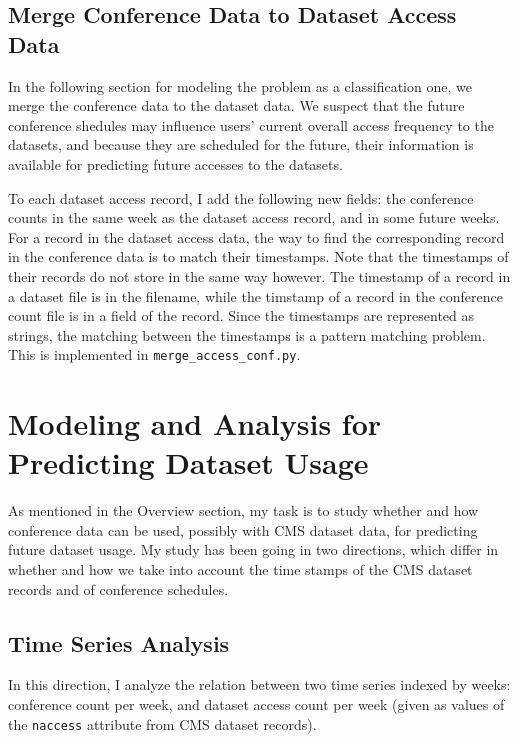 \documentclass[final, 12pt]{elsarticle}
\begin{document}
\subsection{Merge Conference Data to Dataset Access Data}

In the following section for modeling the problem as a classification one, we  merge the conference data to the dataset data.
We suspect that the future conference shedules may influence users' current overall access frequency to the datasets, and because they are scheduled for the future, their information is available for predicting future accesses to the datasets.

To each dataset access record, I add the following new fields: the conference counts in the same week as the dataset access record, and in some future weeks.
For a record in the dataset access data, the way to find the corresponding record in the conference data is to match their timestamps.
Note that the timestamps of their records do not store in the same way however. The timestamp of a record in a dataset file is in the filename, while the timstamp of a record in the conference count file is in a field of the record.
Since the timestamps are represented as strings, the matching between the timestamps is a pattern matching problem. This is implemented in \verb|merge_access_conf.py|.


\section{Modeling and Analysis for Predicting Dataset Usage}


As mentioned in the Overview section,
my task is to study whether and how conference data can be used, possibly with CMS dataset data, for predicting future dataset usage.
My study has been going in two directions, which differ in whether and how we take into account the time stamps of the CMS dataset records and of conference schedules.

\subsection{Time Series Analysis}

In this direction, I analyze the relation between two time series indexed by weeks: conference count per week, and dataset access count per week (given as values of the \verb|naccess| attribute from CMS dataset records).
\end{document}
